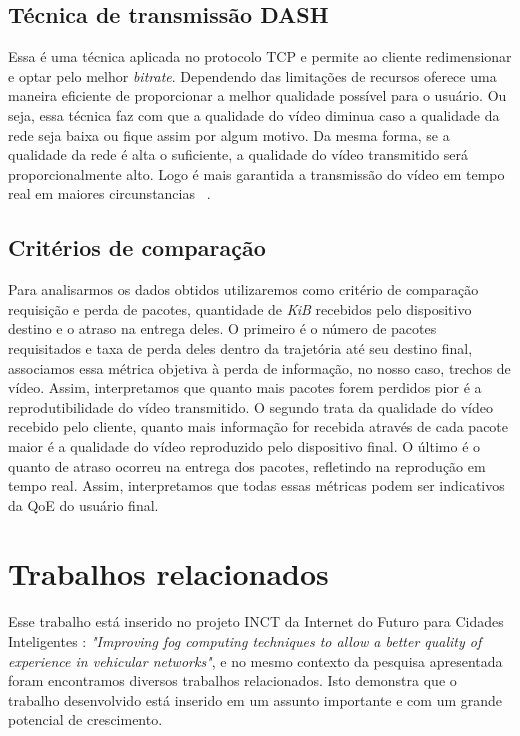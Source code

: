 \documentclass[12pt]{article}
\begin{document}
\subsection{Técnica de transmissão DASH}
	Essa é uma técnica aplicada no protocolo TCP e permite ao cliente redimensionar e optar pelo melhor \textit{bitrate}. Dependendo das limitações de recursos oferece uma maneira eficiente de proporcionar a melhor qualidade possível para o usuário. Ou seja, essa técnica faz com que a qualidade do vídeo diminua caso a qualidade da rede seja baixa ou fique assim por algum motivo. Da mesma forma, se a qualidade da rede é alta o suficiente, a qualidade do vídeo transmitido será proporcionalmente alto. Logo é mais garantida a transmissão do vídeo em tempo real em maiores circunstancias~\cite{5} .  
  
\subsection{Critérios de comparação}
    Para analisarmos os dados obtidos utilizaremos como critério de comparação requisição e perda de pacotes, quantidade de \textit{KiB} recebidos pelo dispositivo destino e o atraso na entrega deles. O primeiro é o número de pacotes requisitados e taxa de perda deles dentro da trajetória até seu destino final, associamos essa métrica objetiva à perda de informação, no nosso caso, trechos de vídeo. Assim, interpretamos que quanto mais pacotes forem perdidos pior é a reprodutibilidade do vídeo transmitido. O segundo trata da qualidade do vídeo recebido pelo cliente, quanto mais informação for recebida através de cada pacote maior é a qualidade do vídeo reproduzido pelo dispositivo final. O último é o quanto de atraso ocorreu na entrega dos pacotes, refletindo na reprodução em tempo real. Assim, interpretamos que todas essas métricas podem ser indicativos da QoE do usuário final.

\section{Trabalhos relacionados} \label{sec:trabalhos}
	Esse trabalho está inserido no projeto INCT da Internet do Futuro para Cidades Inteligentes : \textit{"Improving fog computing techniques to allow a better quality of experience in vehicular networks"}, e no mesmo contexto da pesquisa apresentada foram encontramos diversos trabalhos relacionados. Isto demonstra que o trabalho desenvolvido está inserido em um assunto importante e com um grande potencial de crescimento.
    
\end{document}
